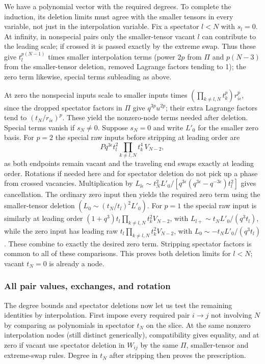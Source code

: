 We have a polynomial vector with the required degrees. To complete the
induction, its deletion limits must agree with the smaller tensors in
every variable, not just in the interpolation variable. Fix a spectator
\(l<N\) with \(s_l=0\). At infinity, in nonspecial pairs only the smaller-tensor vacant \(l\) can contribute to the leading scale; if crossed it is passed exactly by the extreme swap. Thus these give \(t_l^{p(N-1)}\) times smaller interpolation terms (power \(2p\) from \(\Pi\) and \(p(N-3)\) from the smaller-tensor deletion, removed Lagrange factors tending to 1); the zero term likewise, special terms subleading as above.

At zero the nonspecial inputs scale to smaller inputs times \((\prod_{k\ne l,N}t_k^p)r_{i\epsilon}^p\), since the dropped spectator factors in \(\Pi\) give \(q^{3p}u^{2p}\); their extra Lagrange factors tend to \((t_N/r_{i\epsilon})^p\). These yield the nonzero-node terms needed after deletion. Special terms vanish if \(s_N\ne0\). Suppose \(s_N=0\) and write \(L'_0\) for the smaller zero basis. For \(p=2\) the special raw inputs before stripping at leading order are
\[
 P q^{3\epsilon} t_l^2 \!\!\prod_{k\ne l,N}t_k^4\, V_{N-2},
\]
as both endpoints remain vacant and the traveling end swaps exactly at leading order. Rotations if needed here and for spectator deletion do not pick up a phase from crossed vacancies. Multiplication by \(L_{l\epsilon}\sim t_N^2L'_0/[q^{3\epsilon}(q^{3\epsilon}-q^{-3\epsilon})t_l^2]\) gives cancellation. The ordinary zero input then yields the required zero term using the smaller-tensor deletion \((L_0\sim (t_N/t_l)^2L'_0)\). For \(p=1\) the special raw input is similarly at leading order
\((1+q^3)t_l\prod_{k\ne l,N}t_k^2 V_{N-2}\), with \(L_{l+}\sim t_N L'_0/(q^3 t_l)\), while the zero input has leading raw \(t_l\prod_{k\ne l,N}t_k^2 V_{N-2}\), with \(L_0\sim-t_N L'_0/(q^3t_l)\). These combine to exactly the desired zero term. Stripping spectator factors is common to all of these comparisons. This proves both deletion limits for \(l<N\); vacant \(t_N=0\) is already a node.

\subsubsection{All pair values, exchanges, and rotation}

The degree bounds and spectator deletions now let us test the remaining
identities by interpolation. First impose every required pair
\(i\to j\) not involving \(N\) by comparing as polynomials in spectator \(t_N\) on the slice. At the same nonzero interpolation nodes (still distinct generically), compatibility gives equality, and at zero if vacant use spectator deletion in \(W_{ij}\) by the same \(\Pi\), smaller-tensor and extreme-swap rules. Degree in \(t_N\) after stripping then proves the prescription.

